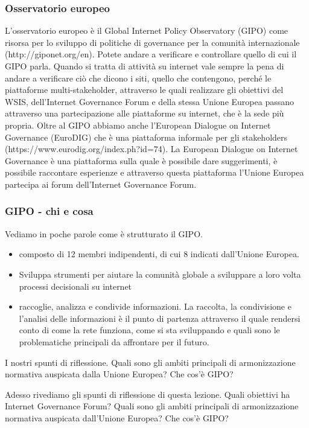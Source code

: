\subsubsection{Osservatorio europeo}
L'osservatorio europeo è il Global Internet Policy Observatory (GIPO) come risorsa per lo sviluppo di politiche di governance per la comunità internazionale (http://giponet.org/en). Potete andare a verificare e controllare quello di cui il GIPO parla. Quando si tratta di attività su internet vale sempre la pena di andare a verificare ciò che dicono i siti, quello che contengono, perché le piattaforme multi-stakeholder, attraverso le quali realizzare gli obiettivi del WSIS, dell'Internet Governance Forum e della stessa Unione Europea passano attraverso una partecipazione alle piattaforme su internet, che è la sede più propria.
Oltre al GIPO abbiamo anche l'European Dialogue on Internet Governance (EuroDIG) che è una piattaforma informale per gli stakeholders (https://www.eurodig.org/index.ph?id=74). La European Dialogue on Internet Governance è una piattaforma sulla quale è possibile dare suggerimenti, è possibile raccontare esperienze e attraverso questa piattaforma l'Unione Europea partecipa ai forum dell'Internet Governance Forum.

\subsubsection{GIPO - chi e cosa}
Vediamo in poche parole come è strutturato il GIPO.

\begin{itemize}
    \item composto di 12 membri indipendenti, di cui 8 indicati dall'Unione Europea.
    \item Sviluppa strumenti per aiutare la comunità globale a sviluppare a loro volta processi decisionali su internet
    \item raccoglie, analizza e condivide informazioni. La raccolta, la condivisione e l'analisi delle informazioni è il punto di partenza attraverso il quale rendersi conto di come la rete funziona, come si sta sviluppando e quali sono le problematiche principali da affrontare per il futuro.
\end{itemize}

I nostri spunti di riflessione. Quali sono gli ambiti principali di armonizzazione normativa auspicata dalla Unione Europea? Che cos'è GIPO?


Adesso rivediamo gli spunti di riflessione di questa lezione. Quali obiettivi ha Internet Governance Forum? Quali sono gli ambiti principali di armonizzazione normativa auspicata dall'Unione Europea? Che cos'è GIPO?